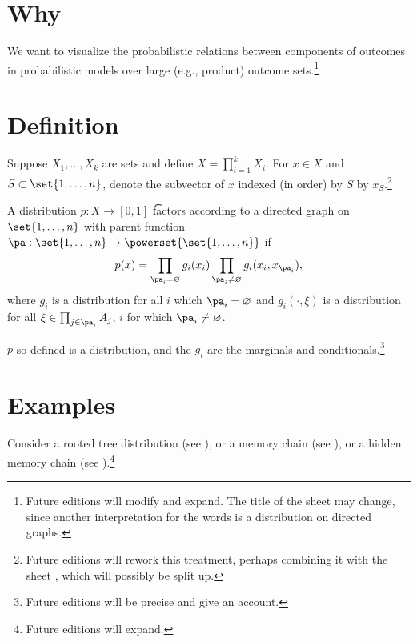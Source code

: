 

\section*{Why}

We want to visualize the probabilistic relations between components of outcomes in probabilistic models over large (e.g., product) outcome sets.\footnote{Future editions will modify and expand. The title of the sheet may change, since another interpretation for the words  is a distribution on directed graphs.}

\section*{Definition}

Suppose $X_1, \dots , X_k$ are sets and define $X = \prod_{i = 1}^k X_i$.
For $x \in X$ and $S \subset \set{1, \dots , n}$, denote the subvector of $x$ indexed (in order) by $S$ by $x_S$.\footnote{Future editions will rework this treatment, perhaps combining it with the sheet , which will possibly be split up.}

A distribution $p: X \to [0, 1]$ \t{factors according to a directed graph} on $\set{1, \dots , n}$ with parent function $\pa: \set{1,\dots ,n} \to \powerset{\set{1, \dots , n}}$ if
    \[
p(x) = \prod_{\pa_i = \varnothing} g_i(x_i) \prod_{\pa_i \neq \varnothing} g_{i}(x_i, x_{\pa_i}),
    \]
where $g_i$ is a distribution for all $i$ which $\pa_i = \varnothing$ and $g_{i}(\cdot , \xi )$ is a distribution for all $\xi  \in \prod_{j \in \pa_i} A_j$, $i$ for which $\pa_i \neq \varnothing$.

\begin{proposition}
$p$ so defined is a distribution, and the $g_i$ are the marginals and conditionals.\footnote{Future editions will be precise and give an account.}\end{proposition}
\section*{Examples}

Consider a rooted tree distribution (see ), or a memory chain (see ), or a hidden memory chain (see ).\footnote{Future editions will expand.}
